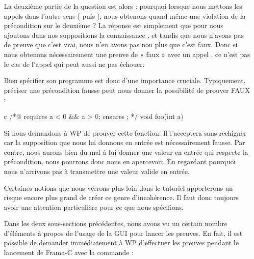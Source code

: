 La deuxième partie de la question est alors : pourquoi lorsque nous mettons les 
appels dans l'autre sens ( puis ), nous obtenons 
quand même une violation de la précondition sur le deuxième ? La réponse est 
simplement que pour  nous ajoutons dans nos suppositions la
connaissance , et tandis que nous n'avons pas de preuve
que c'est vrai, nous n'en avons pas non plus que c'est faux. Donc si nous obtenons 
nécessairement une preuve de « faux » avec un appel , ce n'est
pas le cas de l'appel  qui peut aussi ne pas échouer.



Bien spécifier son programme est donc d'une importance cruciale. Typiquement, 
préciser une précondition fausse peut nous donner la possibilité de prouver 
FAUX :



\begin{CodeBlock}{c}
/*@
  requires a < 0 && a > 0;
  ensures  \false;
*/
void foo(int a){

}
\end{CodeBlock}



Si nous demandons à WP de prouver cette fonction. Il l'acceptera sans rechigner
car la supposition que nous lui donnons en entrée est nécessairement fausse. Par
contre, nous aurons bien du mal à lui donner une valeur en entrée qui respecte la 
précondition, nous pourrons donc nous en apercevoir. En regardant pourquoi nous
n'arrivons pas à transmettre une valeur valide en entrée.



Certaines notions que nous verrons plus loin dans le tutoriel apporterons un 
risque encore plus grand de créer ce genre d'incohérence. Il faut donc toujours
avoir une attention particulière pour ce que nous spécifions.








Dans les deux sous-sections précédentes, nous avons vu un certain nombre 
d'éléments à propos de l'usage de la GUI pour lancer les preuves. En fait, 
il est possible de demander immédiatement à WP d'effectuer les preuves pendant
le lancement de Frama-C avec la commande :






